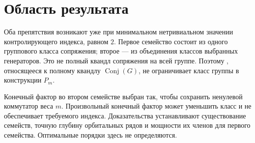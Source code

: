\documentclass[11pt,a4paper]{article}
\theoremstyle{definition}
\theoremstyle{remark}
\begin{document}
\section{Область результата}

Оба препятствия возникают уже при минимальном нетривиальном
значении контролирующего индекса, равном \(2\).
Первое семейство состоит из одного группового класса сопряжения;
второе --- из объединения классов выбранных генераторов.
Это не полный квандл сопряжения на всей группе.
Поэтому \cite[следствие~5.24]{BCNW}, относящееся
к полному квандлу \(\operatorname{Conj}(G)\), не ограничивает
класс группы в конструкции \(P_m\).

Конечный фактор во втором семействе выбран так,
чтобы сохранить ненулевой коммутатор веса \(m\).
Произвольный конечный фактор может уменьшить класс
и не обеспечивает требуемого индекса.
Доказательства устанавливают существование семейств, точную глубину
орбитальных рядов и мощности их членов для первого семейства.
Оптимальные порядки здесь не определяются.
\end{document}
